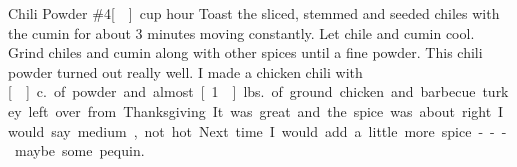 \begin{recipe}{Chili Powder \#4}{\unit[]{cup}}{ hour}
Toast the sliced, stemmed and seeded chiles with the cumin for about 3 minutes moving constantly.  Let chile and cumin cool.
Grind chiles and cumin along with other spices until a fine powder.
\freeform This chili powder turned out really well.  I made a chicken chili with \unit[]{c.} of powder and almost \unit[1]{lbs.} of ground chicken and barbecue turkey left over from Thanksgiving.  It was great and the spice was about right.  I would say medium, not hot.  Next time I would add a little more spice --- maybe some pequin.
\end{recipe}
